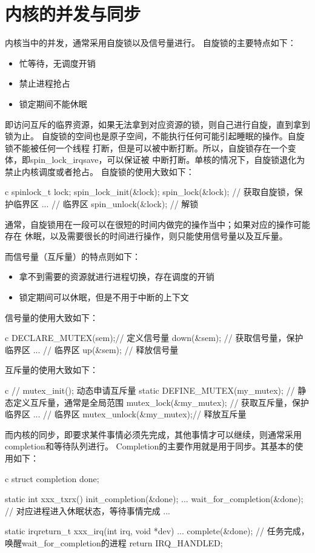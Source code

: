 \section{内核的并发与同步}
内核当中的并发，通常采用自旋锁以及信号量进行。
自旋锁的主要特点如下：
\begin{itemize}
  \item 忙等待，无调度开销
  \item 禁止进程抢占
  \item 锁定期间不能休眠
\end{itemize}
即访问互斥的临界资源，如果无法拿到对应资源的锁，则自己进行自旋，直到拿到锁为止。
自旋锁的空间也是原子空间，不能执行任何可能引起睡眠的操作。自旋锁不能被任何一个线程
打断，但是可以被中断打断。所以，自旋锁存在一个变体，即spin\_lock\_irqsave，可以保证被
中断打断。单核的情况下，自旋锁退化为禁止内核调度或者抢占。
自旋锁的使用大致如下：
\begin{code-block}{c}
spinlock_t lock;
spin_lock_init(&lock);
spin_lock(&lock);   // 获取自旋锁，保护临界区
...                 // 临界区
spin_unlock(&lock); // 解锁
\end{code-block}
通常，自旋锁用在一段可以在很短的时间内做完的操作当中；如果对应的操作可能存在
休眠，以及需要很长的时间进行操作，则只能使用信号量以及互斥量。

而信号量（互斥量）的特点则如下：
\begin{itemize}
  \item 拿不到需要的资源就进行进程切换，存在调度的开销
  \item 锁定期间可以休眠，但是不用于中断的上下文
\end{itemize}
信号量的使用大致如下：
\begin{code-block}{c}
DECLARE_MUTEX(sem);// 定义信号量
down(&sem); // 获取信号量，保护临界区
... // 临界区
up(&sem); // 释放信号量
\end{code-block}

互斥量的使用大致如下：
\begin{code-block}{c}
// mutex_init(); 动态申请互斥量
static DEFINE_MUTEX(my_mutex); // 静态定义互斥量，通常是全局范围
mutex_lock(&my_mutex);  // 获取互斥量，保护临界区
... // 临界区
mutex_unlock(&my_mutex);// 释放互斥量
\end{code-block}

而内核的同步，即要求某件事情必须先完成，其他事情才可以继续，则通常采用completion和等待队列进行。
Completion的主要作用就是用于同步。其基本的使用如下：
\begin{code-block}{c}
struct completion done;

static int xxx_txrx()
{
        init_completion(&done);
        ...
        wait_for_completion(&done); // 对应进程进入休眠状态，等待事情完成
        ...
}

static irqreturn_t xxx_irq(int irq, void *dev)
{
        ...
        complete(&done);            // 任务完成，唤醒wait_for_completion的进程
        return IRQ_HANDLED;
}
\end{code-block}

